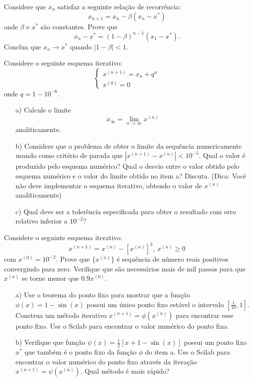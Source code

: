 \documentclass[main.tex]{subfiles}
\begin{document}
\begin{Exercise}Considere que $x_n$ satisfaz a seguinte relação de recorrência:
$$x_{n+1}=x_n - \beta \left(x_n-x^*\right)$$
onde $\beta$ e $x^*$ são constantes.
Prove que $$x_n-x^*=(1-\beta)^{n-1}(x_1-x^*).$$
Conclua que $x_n\to x^*$ quando $|1-\beta|<1$.
\end{Exercise}

\begin{Exercise}[title=Convergência lenta] Considere o seguinte esquema iterativo:
$$
\left\{\begin{array}{l}
x^{(n+1)}=x_n+q^n\\
x^{(0)}=0
\end{array}
\right.$$
onde $q=1-10^{-6}$.
\begin{itemize}
\item[a)] Calcule o limite $$x_\infty=\lim_{n\to\infty}x^{(n)}$$ analiticamente.
\item[b)] Considere que o problema de obter o limite da sequência numericamente usando como critério de parada que $|x^{(n+1)}-x^{(n)}|<10^{-5}$. Qual o valor é produzido pelo esquema numérico? Qual o desvio entre o valor obtido pelo esquema numérico e o valor do limite obtido no item a?  Discuta. (Dica: Você não deve implementar o esquema iterativo, obtendo o valor de $x^{(n)}$ analiticamente)
\item[c)] Qual deve ser a tolerência especificada para obter o resultado com erro relativo inferior a $10^{-2}$?
\end{itemize}
\end{Exercise}

\begin{Exercise}[title=Convergência sublinear] Considere o seguinte esquema iterativo:
$$x^{(n+1)}=x^{(n)}-[x^{(n)}]^3,\ x^{(n)}\geq 0$$
com $x^{(0)}= 10^{-2}$.
Prove que $\{x^{(n)}\}$ é sequência de número reais positivos convergindo para zero. Verifique que são necessários mais de mil passos para que $x^{(n)}$ se torne menor que $0.9 x^{(0)}$.
\end{Exercise}


\begin{Exercise}[title=Taxa de convergência]
\begin{itemize}
\item[a)] Use o teorema do ponto fixo para mostrar que a função $\phi(x)=1-\sin(x)$ possui um único ponto fixo estável o intervalo $[\frac{1}{10},1]$. Construa um método iterativo $x^{(n+1)}=\phi(x^{(n)})$ para encontrar esse ponto fixo. Use o Scilab para encontrar o valor numérico do ponto fixo.
\item[b)] Verifique que função $\psi(x)=\frac{1}{2}\left[x+1-\sin(x)\right]$ possui um ponto fixo $x^*$ que também é o ponto fixo da função $\phi$ do item a. Use o Scilab para encontrar o valor numérico do ponto fixo através da iteração $x^{(n+1)}=\psi(x^{(n)})$. Qual método é mais rápido?
\end{itemize}
\end{Exercise}
\end{document}
